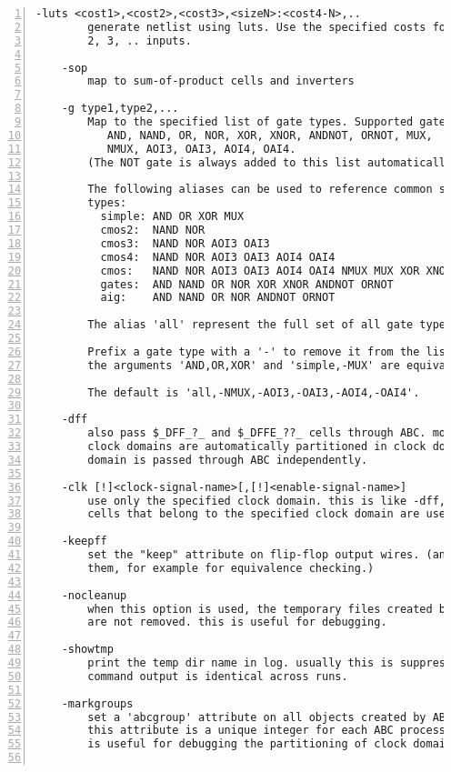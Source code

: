 \begin{lstlisting}[numbers=left,frame=single]
    -luts <cost1>,<cost2>,<cost3>,<sizeN>:<cost4-N>,..
        generate netlist using luts. Use the specified costs for luts with 1,
        2, 3, .. inputs.

    -sop
        map to sum-of-product cells and inverters

    -g type1,type2,...
        Map to the specified list of gate types. Supported gates types are:
           AND, NAND, OR, NOR, XOR, XNOR, ANDNOT, ORNOT, MUX,
           NMUX, AOI3, OAI3, AOI4, OAI4.
        (The NOT gate is always added to this list automatically.)

        The following aliases can be used to reference common sets of gate
        types:
          simple: AND OR XOR MUX
          cmos2:  NAND NOR
          cmos3:  NAND NOR AOI3 OAI3
          cmos4:  NAND NOR AOI3 OAI3 AOI4 OAI4
          cmos:   NAND NOR AOI3 OAI3 AOI4 OAI4 NMUX MUX XOR XNOR
          gates:  AND NAND OR NOR XOR XNOR ANDNOT ORNOT
          aig:    AND NAND OR NOR ANDNOT ORNOT

        The alias 'all' represent the full set of all gate types.

        Prefix a gate type with a '-' to remove it from the list. For example
        the arguments 'AND,OR,XOR' and 'simple,-MUX' are equivalent.

        The default is 'all,-NMUX,-AOI3,-OAI3,-AOI4,-OAI4'.

    -dff
        also pass $_DFF_?_ and $_DFFE_??_ cells through ABC. modules with many
        clock domains are automatically partitioned in clock domains and each
        domain is passed through ABC independently.

    -clk [!]<clock-signal-name>[,[!]<enable-signal-name>]
        use only the specified clock domain. this is like -dff, but only FF
        cells that belong to the specified clock domain are used.

    -keepff
        set the "keep" attribute on flip-flop output wires. (and thus preserve
        them, for example for equivalence checking.)

    -nocleanup
        when this option is used, the temporary files created by this pass
        are not removed. this is useful for debugging.

    -showtmp
        print the temp dir name in log. usually this is suppressed so that the
        command output is identical across runs.

    -markgroups
        set a 'abcgroup' attribute on all objects created by ABC. The value of
        this attribute is a unique integer for each ABC process started. This
        is useful for debugging the partitioning of clock domains.


\end{lstlisting}
